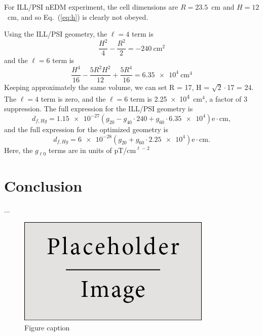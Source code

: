 \documentclass[preprint,12pt]{elsarticle}
\begin{document}
For ILL/PSI nEDM experiment, the cell dimensions are $R=23.5$~cm and
$H=12$~cm, and so Eq.~(\ref{eq:h}) is clearly not obeyed.

Using the ILL/PSI geometry, the $\ell=4$ term is
\begin{equation}
\frac{H^{2}}{4}-\frac{R^2}{2}=-240~\mathrm{cm}^2
\end{equation}
and the $\ell=6$ term is
\begin{equation}
\frac{H^{4}}{16}-\frac{5R^2H^2}{12}+\frac{5R^4}{16}=\num{6.35e4}~\mathrm{cm}^4
\end{equation}
Keeping approximately the same volume, we can set R = 17, H =
$\sqrt{2}\cdot$17 = 24.  The $\ell=4$ term is zero, and the $\ell=6$
term is \num{2.25e4}~cm$^4$, a factor of 3 suppression.
The full expression for the ILL/PSI geometry is
\begin{equation}
    d_{f,Hg} = \num{1.15e-27}\left(g_{20} - g_{40}\cdot240 + g_{60}\cdot\num{6.35e4}\right)\mathrm{e}\cdot\mathrm{cm},
\end{equation}
and the full expression for the optimized geometry is
\begin{equation}
    d_{f,Hg} = \num{6e-28}\left(g_{20} + g_{60}\cdot\num{2.25e4}\right)\mathrm{e}\cdot\mathrm{cm}.
\end{equation}
Here, the $g_{\ell0}$ terms are in units of pT/cm$^{\ell-2}$
\section{Conclusion}

...


\begin{figure}[h]
\centering\includegraphics[width=0.4\linewidth]{placeholder}
\caption{Figure caption}
\end{figure}



\end{document}
